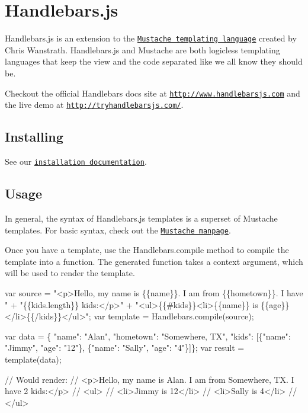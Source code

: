 \href{https://travis-ci.org/wycats/handlebars.js}{\tt } \href{https://saucelabs.com/u/handlebars}{\tt }

\section*{Handlebars.\+js }

Handlebars.\+js is an extension to the \href{http://mustache.github.com/}{\tt Mustache templating language} created by Chris Wanstrath. Handlebars.\+js and Mustache are both logicless templating languages that keep the view and the code separated like we all know they should be.

Checkout the official Handlebars docs site at \href{http://www.handlebarsjs.com}{\tt http\+://www.\+handlebarsjs.\+com} and the live demo at \href{http://tryhandlebarsjs.com/}{\tt http\+://tryhandlebarsjs.\+com/}.

\subsection*{Installing }

See our \href{http://handlebarsjs.com/installation.html}{\tt installation documentation}.

\subsection*{Usage }

In general, the syntax of Handlebars.\+js templates is a superset of Mustache templates. For basic syntax, check out the \href{http://mustache.github.com/mustache.5.html}{\tt Mustache manpage}.

Once you have a template, use the {\ttfamily Handlebars.\+compile} method to compile the template into a function. The generated function takes a context argument, which will be used to render the template.


\begin{DoxyCode}
var source = "<p>Hello, my name is \{\{name\}\}. I am from \{\{hometown\}\}. I have " +
             "\{\{kids.length\}\} kids:</p>" +
             "<ul>\{\{#kids\}\}<li>\{\{name\}\} is \{\{age\}\}</li>\{\{/kids\}\}</ul>";
var template = Handlebars.compile(source);

var data = \{ "name": "Alan", "hometown": "Somewhere, TX",
             "kids": [\{"name": "Jimmy", "age": "12"\}, \{"name": "Sally", "age": "4"\}]\};
var result = template(data);

// Would render:
// <p>Hello, my name is Alan. I am from Somewhere, TX. I have 2 kids:</p>
// <ul>
//   <li>Jimmy is 12</li>
//   <li>Sally is 4</li>
// </ul>
\end{DoxyCode}


